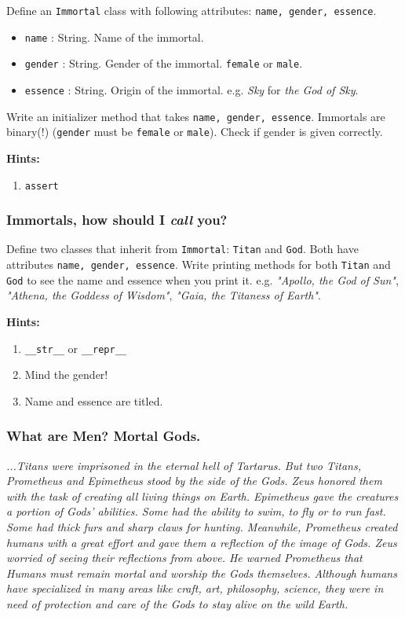 \documentclass[a4paper]{article}
\begin{document}
Define an \texttt{Immortal} class with following attributes: \texttt{name, gender, essence}.

\begin{itemize}
    \item \texttt{name} : String. Name of the immortal.
    \item \texttt{gender} : String. Gender of the immortal. \texttt{female} or \texttt{male}.
    \item \texttt{essence} : String. Origin of the immortal. e.g. \textit{Sky} for \textit{the God of Sky}.
\end{itemize}

Write an initializer method that takes \texttt{name, gender, essence}. Immortals are binary(!) (\texttt{gender} must be \texttt{female} or \texttt{male}). Check if gender is given correctly.

\textbf{Hints:}
\begin{enumerate}
    \item \texttt{assert}
\end{enumerate}

\subsubsection{Immortals, how should I \textit{call} you?}

Define two classes that inherit from \texttt{Immortal}: \texttt{Titan} and \texttt{God}. Both have attributes \texttt{name, gender, essence}. Write printing methods for both \texttt{Titan} and \texttt{God} to see the name and essence when you print it. e.g. \textit{"Apollo, the God of Sun"}, \textit{"Athena, the Goddess of Wisdom"}, \textit{"Gaia, the Titaness of Earth"}.

\textbf{Hints:}
\begin{enumerate}
    \item \texttt{\_\_str\_\_} or \texttt{\_\_repr\_\_}
    \item Mind the gender!
    \item Name and essence are titled.
\end{enumerate}

\subsubsection{What are Men? Mortal Gods.}

\textit{...Titans were imprisoned in the eternal hell of Tartarus. But two Titans, Prometheus and Epimetheus stood by the side of the Gods. Zeus honored them with the task of creating all living things on Earth. Epimetheus gave the creatures a portion of Gods' abilities. Some had the ability to swim, to fly or to run fast. Some had thick furs and sharp claws for hunting. Meanwhile, Prometheus created humans with a great effort and gave them a reflection of the image of Gods. Zeus worried of seeing their reflections from above. He warned Prometheus that Humans must remain mortal and worship the Gods themselves. Although humans have specialized in many areas like craft, art, philosophy, science, they were in need of protection and care of the Gods to stay alive on the wild Earth.}
\end{document}
